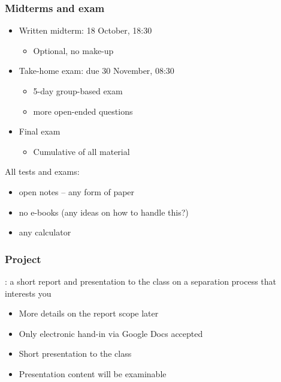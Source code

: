 \begin{frame}\frametitle{Midterms and exam}
	\begin{itemize}
		\item	Written midterm: 18 October, 18:30
		\begin{itemize}
			\item	Optional, no make-up
		\end{itemize}
		
		\item	Take-home exam: due 30 November, 08:30
		\begin{itemize}
			\item	5-day group-based exam
			\item	more open-ended questions
		\end{itemize}
		
		\item	Final exam
		\begin{itemize}
			\item	Cumulative of all material
		\end{itemize}		
	\end{itemize}

	\vspace{12pt}
	All tests and exams:
	\begin{itemize}
		\item	open notes -- any form of paper
		\item	no e-books (any ideas on how to handle this?)
		\item	any calculator
	\end{itemize}	
\end{frame}

\begin{frame}\frametitle{Project}
	\begin{exampleblock}{}
		\textbf{{\color{myBlue}{AIM}}}: a short report and presentation to the class on a separation process that interests you
	\end{exampleblock}
	\begin{itemize}
		\item	More details on the report scope later
		\item	Only electronic hand-in via Google Docs accepted
		\item	Short presentation to the class
		\item	Presentation content will be examinable
	\end{itemize}
\end{frame}

